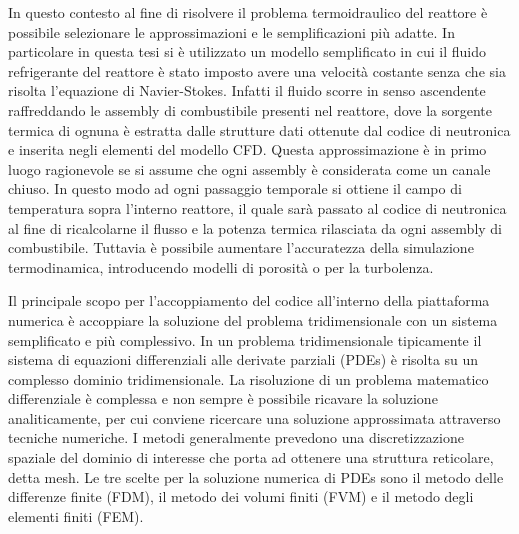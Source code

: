 In questo contesto al fine di risolvere il problema termoidraulico del reattore 
è possibile selezionare le approssimazioni e le semplificazioni più adatte.
In particolare in questa tesi si è utilizzato un modello semplificato in cui 
il fluido refrigerante del reattore è stato imposto avere una velocità costante 
senza che sia risolta l'equazione di Navier-Stokes.
Infatti il fluido scorre in senso ascendente raffreddando le assembly di 
combustibile presenti nel reattore, dove la sorgente termica di ognuna è 
estratta dalle strutture dati ottenute dal codice di neutronica e inserita negli 
elementi del modello CFD. Questa approssimazione è in primo luogo ragionevole se 
si assume che ogni assembly è considerata come un canale chiuso.
In questo modo ad ogni passaggio temporale si ottiene il campo di temperatura 
sopra l'interno reattore, il quale sarà passato al codice di neutronica al fine 
di ricalcolarne il flusso e la potenza termica rilasciata da ogni assembly di 
combustibile.
Tuttavia è possibile aumentare l'accuratezza della simulazione termodinamica, 
introducendo modelli di porosità o per la turbolenza.

Il principale scopo per l'accoppiamento del codice all'interno
della piattaforma numerica è accoppiare la soluzione del problema 
tridimensionale con un sistema semplificato e più complessivo.
In un problema tridimensionale tipicamente il sistema di equazioni
differenziali alle derivate parziali (PDEs) è risolta su un 
complesso dominio tridimensionale.
La risoluzione di un problema matematico differenziale è complessa 
e non sempre è possibile ricavare la soluzione analiticamente,
per cui conviene ricercare una soluzione approssimata 
attraverso tecniche numeriche. 
I metodi generalmente prevedono una discretizzazione 
spaziale del dominio di interesse che porta ad ottenere una struttura reticolare, detta mesh.
Le tre scelte per la soluzione numerica di PDEs sono il metodo delle
differenze finite (FDM), il metodo dei volumi finiti (FVM) e il metodo degli elementi finiti (FEM).

